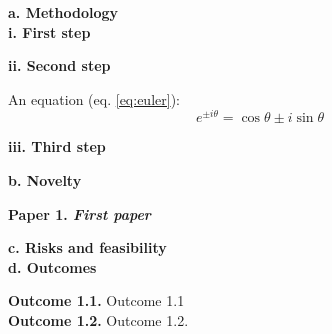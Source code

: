 \documentclass[a4paper,12pt]{article}
\begin{document}
    
    \noindent \textbf{a. Methodology}\\ [0.1 cm]

    \textbf{i. First step}
    
    \textbf{ii. Second step} 	
    \vspace*{5mm}
     
  An equation (eq. \ref{eq:euler}):
  \begin{equation} \label{eq:euler}
  e^{ \pm i\theta } = \cos \theta \pm i\sin \theta
  \end{equation}
  
    \textbf{iii. Third step}
	\vspace*{5mm}
	
	
	\noindent \textbf{b. Novelty}\\ [0.1 cm] 
	    
\begin{tcolorbox}[minipage,colback=mossgreen,arc=10pt,outer arc=10pt]
\centering
\textbf{Paper 1. \emph{First paper}}
\end{tcolorbox}
    
    \vspace*{5mm}
    
    \noindent \textbf{c. Risks and feasibility}\\ [0.1 cm] 

    \noindent \textbf{d. Outcomes} \vspace*{5mm}

\textbf{Outcome 1.1.} Outcome 1.1\\

\textbf{Outcome 1.2.} Outcome 1.2.


    
\end{document}
